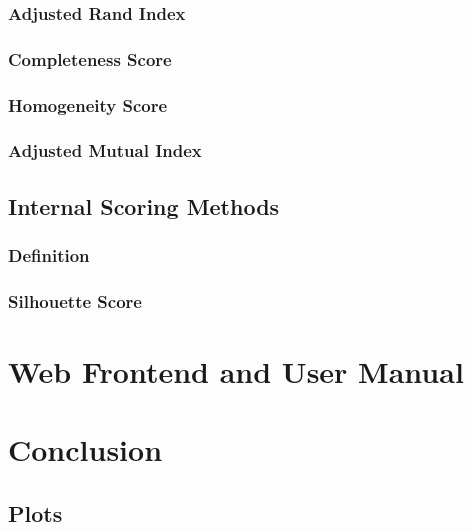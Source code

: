 \documentclass[12pt, english]
{article}
\begin{document}
\subsubsection{Adjusted Rand Index}

\subsubsection{Completeness Score}

\subsubsection{Homogeneity Score}

\subsubsection{Adjusted Mutual Index}

\subsection{Internal Scoring Methods}
\subsubsection{Definition}

\subsubsection{Silhouette Score}



\section{Web Frontend and User Manual}


\section{Conclusion}


\newpage

\printglossary[style=altlist,title=Glossary]
 
\printglossary[type=\acronymtype,style=long]
 
\printglossary[type=symbolslist,style=long]

\newpage




\nocite{*}

\begin{appendices}
	\section{Plots}
	
\end{appendices}
\end{document}

